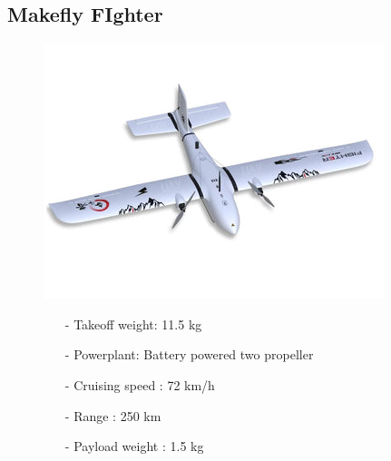 \documentclass{article}
\begin{document}
\subsection{Makefly FIghter}
\begin{figure}[h]
    \begin{minipage}[b]{.45\linewidth}
        \centering
        \includegraphics[width=0.7\linewidth]{Aircraft pics/MAKEFLYEASY FIGHTER.png}
    \end{minipage}\hfill
    \begin{minipage}[b]{0.45\linewidth}
        \begin{itemize}
            \item [-] Takeoff weight: 11.5 kg
            \item [-] Powerplant: Battery powered two propeller
            \item [-] Cruising speed : 72 km/h 
            \item [-] Range : 250 km 
            \item [-] Payload weight : 1.5 kg
        \end{itemize}
    \end{minipage}
\end{figure}

\vspace{\fill}
\clearpage
\end{document}
